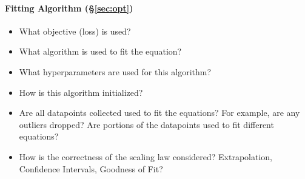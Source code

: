 {\begin{minipage}{38em}
\begin{minipage}[t]{0.48\textwidth}
\paragraph{Fitting Algorithm (\S\ref{sec:opt})}
\begin{itemize}[leftmargin=*]
    \item What objective (loss) is used?
    \item What algorithm is used to fit the equation?
    \item What hyperparameters are used for this algorithm?
    \item How is this algorithm initialized?
    \item Are all datapoints collected used to fit the equations? For example, are any outliers dropped? Are portions of the datapoints used to fit different equations?
    \item How is the correctness of the scaling law considered? Extrapolation, Confidence Intervals, Goodness of Fit?
\end{itemize}

\end{minipage}


\end{minipage}}